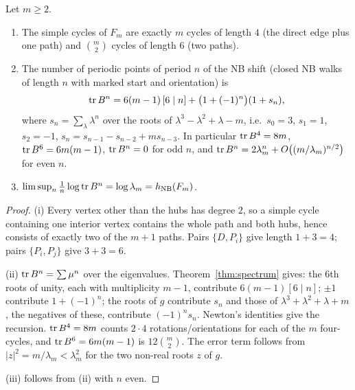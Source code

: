 \begin{theorem}\label{thm:periodic}
Let $m\ge2$.
\begin{enumerate}[label=(\roman*),itemsep=1pt]
\item The simple cycles of $F_m$ are exactly $m$ cycles of length $4$ (the direct edge plus one path) and $\binom m2$ cycles of length $6$ (two paths).
\item The number of periodic points of period $n$ of the NB shift (closed NB walks of length $n$ with marked start and orientation) is
\[
\operatorname{tr} B^n=6(m-1)\,[6\mid n]+\bigl(1+(-1)^n\bigr)(1+s_n),
\]
where $s_n=\sum_\lambda\lambda^n$ over the roots of $\lambda^3-\lambda^2+\lambda-m$, i.e.\ $s_0=3$, $s_1=1$, $s_2=-1$, $s_n=s_{n-1}-s_{n-2}+ms_{n-3}$. In particular $\operatorname{tr} B^4=8m$, $\operatorname{tr} B^6=6m(m-1)$, $\operatorname{tr} B^n=0$ for odd $n$, and $\operatorname{tr} B^n=2\lambda_m^n+O\bigl((m/\lambda_m)^{n/2}\bigr)$ for even $n$.
\item $\limsup_n\frac1n\log\operatorname{tr} B^n=\log\lambda_m=h_{\mathrm{NB}}(F_m)$.
\end{enumerate}
\end{theorem}
\begin{proof}
(i) Every vertex other than the hubs has degree $2$, so a simple cycle containing one interior vertex contains the whole path and both hubs, hence consists of exactly two of the $m+1$ paths. Pairs $\{D,P_i\}$ give length $1+3=4$; pairs $\{P_i,P_j\}$ give $3+3=6$.

(ii) $\operatorname{tr} B^n=\sum\mu^n$ over the eigenvalues. Theorem~\ref{thm:spectrum} gives: the $6$th roots of unity, each with multiplicity $m-1$, contribute $6(m-1)[6\mid n]$; $\pm1$ contribute $1+(-1)^n$; the roots of $g$ contribute $s_n$ and those of $\lambda^3+\lambda^2+\lambda+m$, the negatives of these, contribute $(-1)^ns_n$. Newton's identities give the recursion. $\operatorname{tr} B^4=8m$ counts $2\cdot4$ rotations/orientations for each of the $m$ four-cycles, and $\operatorname{tr} B^6=6m(m-1)$ is $12\binom m2$. The error term follows from $|z|^2=m/\lambda_m<\lambda_m^2$ for the two non-real roots $z$ of $g$.

(iii) follows from (ii) with $n$ even. \qedhere
\end{proof}

\begin{table}[h]
\centering\small

\caption{Numbers $\tr B^n$ of periodic NB points of period $n$ for $F_m$ (odd $n$ give $0$).}\label{tab:trace}
\end{table}

\begin{table}[h]
\centering\small

\caption{Numbers $\pi_n=\frac1n\sum_{d\mid n}\mu(n/d)\tr B^d$ of primitive periodic NB orbits of length $n$ in $F_m$ (all entries are non-negative integers).}\label{tab:prime}
\end{table}

